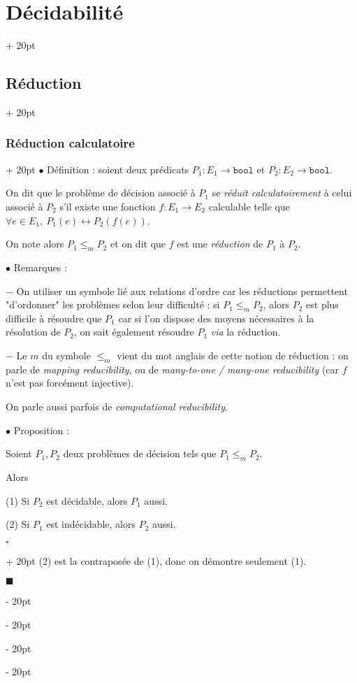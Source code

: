 \documentclass[a4paper, 12pt, twoside]{article}
\renewcommand{\le}{\leqslant}
\newcommand{\ind}[1][20pt]{\advance\leftskip + #1}
\newcommand{\deind}[1][20pt]{\advance\leftskip - #1}
\newenvironment{indt}[2][20pt]{#2 \par \ind[#1]}{\par \deind} %
\newenvironment{proof}[1][{}]{\begin{indt}{$\square$ #1}}{$\blacksquare$ \end{indt}}
\begin{document}
\begin{indt}{\section{Décidabilité}}
\begin{indt}{\subsection{Réduction}}
\begin{indt}{\subsubsection{Réduction calculatoire}}
                $\bullet$ Définition :
                soient deux prédicats $P_1 : E_1 \longrightarrow \mathtt{bool}$ et $P_2 : E_2 \longrightarrow \mathtt{bool}$.

                On dit que le problème de décision associé à $P_1$ se \emph{réduit calculatoirement} à celui associé à $P_2$ s'il existe une fonction $f : E_1 \longrightarrow E_2$ calculable telle que $\forall e \in E_1,\ P_1(e) \leftrightarrow P_2(f(e))$.

                On note alors $P_1 \le_m P_2$ et on dit que $f$ est une \emph{réduction} de $P_1$ à $P_2$.

                \vspace{12pt}
                
                $\bullet$ Remarques :

                $-$ On utiliser un symbole lié aux relations d'ordre car les réductions permettent "d'ordonner" les problèmes selon leur difficulté : si $P_1 \le_m P_2$, alors $P_2$ est plus difficile à résoudre que $P_1$ car si l'on dispose des moyens nécessaires à la résolution de $P_2$, on sait également résoudre $P_1$ \textit{via} la réduction.

                $-$ Le $m$ du symbole $\le_m$ vient du mot anglais de cette notion de réduction : on parle de \emph{mapping reducibility}, ou de \emph{many-to-one / many-one reducibility} (car $f$ n'est pas forcément injective).

                On parle aussi parfois de \emph{computational reducibility}.

                \vspace{12pt}
                
                $\bullet$ Proposition :
                \begin{emphBox}
                    Soient $P_1, P_2$ deux problèmes de décision tels que $P_1 \le_m P_2$.

                    Alors

                    (1) Si $P_2$ est décidable, alors $P_1$ aussi.

                    (2) Si $P_1$ est indécidable, alors $P_2$ aussi.
                \end{emphBox}

                \vspace{6pt}
                
                \begin{proof}
                    (2) est la contraposée de (1), donc on démontre seulement (1).


\end{proof}
\end{indt}
\end{indt}
\end{indt}
\end{document}
